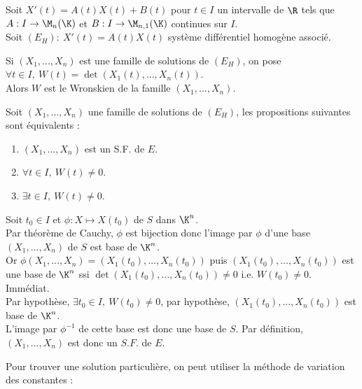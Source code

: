 \documentclass[11pt]{article}
\begin{document}
Soit $X'(t)=A(t)X(t)+B(t)$ pour $t\in I$ un intervalle de $\R$ tels que $A:I\to\M_n(\K)$ et $B:I\to\M_{n,1}(\K)$ continues sur $I$.\\
Soit $(E_H) : ~ X'(t)=A(t)X(t)$ système différentiel homogène associé.

\begin{defi}{}{}
    Si $(X_1,...,X_n)$ est une famille de solutions de $(E_H)$, on pose $\forall t \in I, ~ W(t)=\det(X_1(t),...,X_n(t))$.\\
    Alors $W$ est le Wronskien de la famille $(X_1,...,X_n)$.
\end{defi}

\begin{prop}{}{}
    Soit $(X_1,...,X_n)$ une famille de solutions de $(E_H)$, les propositions suivantes sont équivalents :
    \begin{enumerate}
        \item $(X_1,...,X_n)$ est un S.F. de $E$.
        \item $\forall t \in I, ~ W(t) \neq 0$.
        \item $\exists t \in I, ~ W(t) \neq 0$.
    \end{enumerate}
    \tcblower
     Soit $t_0\in I$ et $\phi:X\mapsto X(t_0)$ de $S$ dans $\K^n$.\\
    Par théorème de Cauchy, $\phi$ est bijection donc l'image par $\phi$ d'une base $(X_1,...,X_n)$ de $S$ est base de $\K^n$.\\
    Or $\phi(X_1,...,X_n)=(X_1(t_0),...,X_n(t_0))$ puis $(X_1(t_0),...,X_n(t_0))$ est une base de $\K^n$ ssi $\det(X_1(t_0),...,X_n(t_0))\neq0$ i.e. $W(t_0)\neq0$.\\
     Immédiat.\\
     Par hypothèse, $\exists t_0 \in I, ~ W(t_0)\neq0$, par hypothèse, $(X_1(t_0),...,X_n(t_0))$ est base de $\K^n$.\\
    L'image par $\phi^{-1}$ de cette base est donc une base de $S$. Par définition, $(X_1,...,X_n)$ est donc un $S.F.$ de $E$.
\end{prop}

Pour trouver une solution particulière, on peut utiliser la méthode de variation des constantes :
\end{document}
